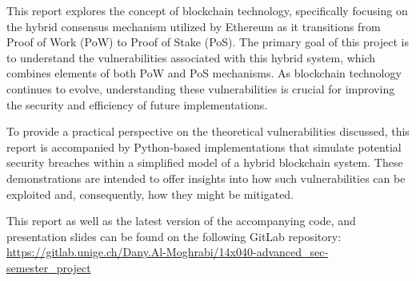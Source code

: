 This report explores the concept of blockchain technology, specifically focusing on the hybrid consensus mechanism utilized by Ethereum as it transitions from Proof of Work (PoW) to Proof of Stake (PoS). The primary goal of this project is to understand the vulnerabilities associated with this hybrid system, which combines elements of both PoW and PoS mechanisms. As blockchain technology continues to evolve, understanding these vulnerabilities is crucial for improving the security and efficiency of future implementations.

To provide a practical perspective on the theoretical vulnerabilities discussed, this report is accompanied by Python-based implementations that simulate potential security breaches within a simplified model of a hybrid blockchain system. These demonstrations are intended to offer insights into how such vulnerabilities can be exploited and, consequently, how they might be mitigated.

This report as well as the latest version of the accompanying code, and presentation slides can be found on the following GitLab repository: \\
\url{https://gitlab.unige.ch/Dany.Al-Moghrabi/14x040-advanced_sec-semester_project}